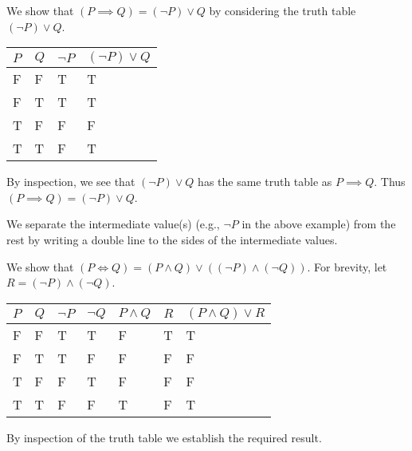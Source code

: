 \begin{example}
    We show that $(P \implies Q) = (\lnot P) \lor Q$ by considering the truth table $(\lnot P) \lor Q$.
    \begin{table}[h]
        \centering
        \begin{tabular}{|l|l||l||l|}
            \hline
            $P$ & $Q$ & $\lnot P$ & $(\lnot P) \lor Q$ \\ \hline
            F   & F   & T         & T                  \\ \hline
            F   & T   & T         & T                  \\ \hline
            T   & F   & F         & F                  \\ \hline
            T   & T   & F         & T                  \\ \hline
        \end{tabular}
    \end{table}
    
    By inspection, we see that $(\lnot P) \lor Q$ has the same truth table as $P \implies Q$. Thus $(P \implies Q) = (\lnot P) \lor Q$.
\end{example}
\begin{remark}
    We separate the intermediate value(s) (e.g., $\lnot P$ in the above example) from the rest by writing a double line to the sides of the intermediate values.
\end{remark}

\begin{example}
    We show that $(P \iff Q) = (P \land Q) \lor ((\lnot P) \land (\lnot Q))$. For brevity, let $R = (\lnot P) \land (\lnot Q)$.
    \begin{table}[h]
        \centering
        \begin{tabular}{|l|l||l|l|l|l||l|}
            \hline
            $P$ & $Q$ & $\lnot P$ & $\lnot Q$ & $P \land Q$ & $R$ & $(P \land Q) \lor R$ \\ \hline
            F   & F   & T         & T         & F           & T   & T                    \\ \hline
            F   & T   & T         & F         & F           & F   & F                    \\ \hline
            T   & F   & F         & T         & F           & F   & F                    \\ \hline
            T   & T   & F         & F         & T           & F   & T                    \\ \hline
        \end{tabular}
    \end{table}

    By inspection of the truth table we establish the required result.
\end{example}

